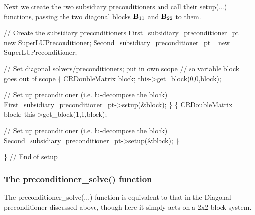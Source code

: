 Next we create the two subsidiary preconditioners and call their {\ttfamily setup}(...) functions, passing the two diagonal blocks ${\bf B}_{11} $ and ${\bf B}_{22} $ to them.


\begin{DoxyCodeInclude}
  \textcolor{comment}{// Create the subsidiary preconditioners}
  First\_subsidiary\_preconditioner\_pt= \textcolor{keyword}{new} SuperLUPreconditioner;
  Second\_subsidiary\_preconditioner\_pt= \textcolor{keyword}{new} SuperLUPreconditioner;
  
  \textcolor{comment}{// Set diagonal solvers/preconditioners; put in own scope}
  \textcolor{comment}{// so variable block goes out of scope}
  \{
   CRDoubleMatrix block;
   this->get\_block(0,0,block);

   \textcolor{comment}{// Set up preconditioner (i.e. lu-decompose the block)}
   First\_subsidiary\_preconditioner\_pt->setup(&block);
  \}
  \{
   CRDoubleMatrix block;
   this->get\_block(1,1,block);
   
   \textcolor{comment}{// Set up preconditioner (i.e. lu-decompose the block)}
   Second\_subsidiary\_preconditioner\_pt->setup(&block);
  \}

 \} \textcolor{comment}{// End of setup}

\end{DoxyCodeInclude}
\hypertarget{index_two_plus_three_solve}{}\subsubsection{The preconditioner\+\_\+solve() function}\label{index_two_plus_three_solve}
The {\ttfamily preconditioner\+\_\+solve}(...) function is equivalent to that in the {\ttfamily Diagonal} preconditioner discussed above, though here it simply acts on a 2x2 block system.


